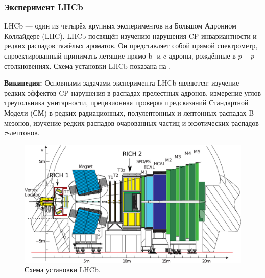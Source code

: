 
\subsubsection{Эксперимент LHCb}

LHCb --- один из четырёх крупных экспериментов на Большом Адронном Коллайдере (LHC). LHCb посвящён изучению нарушения CP-инвариантности и редких распадов тяжёлых ароматов. Он представляет собой прямой спектрометр, спроектированный принимать летящие прямо b- и c-адроны, рождённые в $p-p$ столкновениях. Схема установки LHCb показана на .


\textbf{Википедия:}
Основными задачами эксперимента LHCb являются: изучение редких эффектов CP-нарушения в распадах прелестных адронов, измерение углов треугольника унитарности, прецизионная проверка предсказаний Стандартной Модели (СМ) в редких радиационных, полулептонных и лептонных распадах B-мезонов, изучение редких распадов очарованных частиц и экзотических распадов $\tau$-лептонов.

\begin{figure}[H]
\centering
\includegraphics[width=1.0\textwidth]{pictures/LHCb.png}
\caption{Схема установки LHCb.}
\label{fig:LHCb}
\end{figure}

